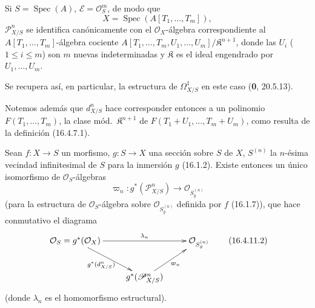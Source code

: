 \begin{corollary}[16.4.10]
\label{IV.16.4.10}
Si $S=\operatorname{Spec}(A)$, $\mathscr{E}=\mathcal{O}_S^m$, de modo que
\[
  X=\operatorname{Spec}(A[T_1,\ldots,T_m]),
\]
$\mathscr{P}_{X/S}^n$ se identifica canónicamente con el
$\mathcal{O}_X$-álgebra correspondiente al $A[T_1,\ldots,T_m]$-álgebra cociente
$A[T_1,\ldots,T_m,U_1,\ldots,U_m]/\mathfrak{K}^{n+1}$,
donde las $U_i$ \textup{(}$1\leq i\leq m$\textup{)} son $m$ nuevas indeterminadas y
$\mathfrak{K}$ es el ideal engendrado por $U_1,\ldots,U_m$.
\end{corollary}

Se recupera así, en particular, la estructura de $\varOmega_{X/S}^1$ en este caso
(\textbf 0, 20.5.13).

Notemos además que $d_{X/S}^n$ hace corresponder entonces a un polinomio
$F(T_1,\ldots,T_m)$, la clase mód.\ $\mathfrak{K}^{n+1}$ de
$F(T_1+U_1,\ldots,T_m+U_m)$, como resulta de la definición (16.4.7.1).

\begin{proposition}[16.4.11]
\label{IV.16.4.11}
Sean $f:X\to S$ un morfismo, $g:S\to X$ una sección sobre $S$ de $X$,
$S^{(n)}$ la $n$-ésima vecindad infinitesimal de $S$ para la inmersión $g$
\textup{(16.1.2)}. Existe entonces un único isomorfismo de
$\mathcal{O}_S$-álgebras
\[
  \varpi_n:g^*(\mathscr{P}_{X/S}^n)\longrightarrow
  \mathcal{O}_{S_g^{(n)}}
  \tag{16.4.11.1}
  \label{IV.16.4.11.1}
\]
(para la estructura de $\mathcal{O}_S$-álgebra sobre
$\mathcal{O}_{S_g^{(n)}}$ definida por $f$ \textup{(16.1.7)}), que hace conmutativo el
diagrama
\[
  \xymatrix{
    \mathcal{O}_S=g^*(\mathcal{O}_X)
      \ar[rr]^-{\lambda_n}\ar[dr]_-{g^*(d_{X/S}^n)}
      &&\mathcal{O}_{S_g^{(n)}}\\
    &g^*(\mathscr{P}_{X/S}^n)\ar[ur]_-{\varpi_n}
  }
  \tag{16.4.11.2}
  \label{IV.16.4.11.2}
\]
(donde $\lambda_n$ es el homomorfismo estructural).
\end{proposition}


